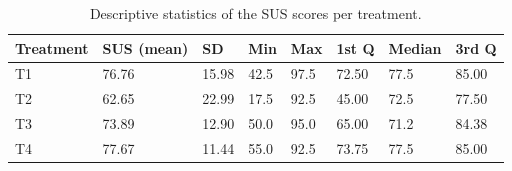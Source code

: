 \begin{table}[tbp]
\centering
\begin{tabular}{@{}llllllll@{}}
\toprule
Treatment & SUS (mean) & SD    & Min  & Max  & 1st Q  & Median & 3rd Q  \\ \midrule
T1          & 76.76       & 15.98 & 42.5 & 97.5 & 72.50 & 77.5   & 85.00 \\
T2          & 62.65       & 22.99 & 17.5 & 92.5 & 45.00 & 72.5   & 77.50 \\
T3          & 73.89       & 12.90 & 50.0 & 95.0 & 65.00 & 71.2   & 84.38 \\
T4          & 77.67       & 11.44 & 55.0 & 92.5 & 73.75 & 77.5   & 85.00 \\
\bottomrule
\end{tabular}
\caption{Descriptive statistics of the SUS scores per treatment.}
\label{tab:sus-score-stats-1}
\end{table}
